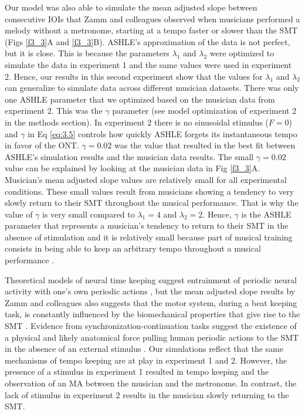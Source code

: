 \documentclass{report}
\begin{document}
Our model was also able to simulate the mean adjusted slope between consecutive IOIs that Zamm and colleagues \cite{zamm2018musicians} observed when musicians performed a melody without a metronome, starting at a tempo faster or slower than the SMT (Figs \ref{f3_3}A and \ref{f3_3}B). ASHLE's approximation of the data is not perfect, but it is close. This is because the parameters $\lambda_1$ and $\lambda_2$ were optimized to simulate the data in experiment 1 and the same values were used in experiment 2. Hence, our results in this second experiment show that the values for $\lambda_1$ and $\lambda_2$ can generalize to simulate data across different musician datasets. There was only one ASHLE parameter that we optimized based on the musician data from experiment 2. This was the $\gamma$ parameter (see model optimization of experiment 2 in the methods section). In experiment 2 there is no sinusoidal stimulus ($F=0$) and $\gamma$ in Eq \eqref{eq:3.5} controls how quickly ASHLE forgets its instantaneous tempo in favor of the ONT. $\gamma = 0.02$ was the value that resulted in the best fit between ASHLE's simulation results and the musician data results. The small $\gamma=0.02$ value can be explained by looking at the musician data in Fig \ref{f3_3}A. Musician's mean adjusted slope values are relatively small for all experimental conditions. These small values result from musicians showing a tendency to very slowly return to their SMT throughout the musical performance. That is why the value of $\gamma$ is very small compared to $\lambda_1=4$ and $\lambda_2=2$. Hence, $\gamma$ is the ASHLE parameter that represents a musician's tendency to return to their SMT in the absence of stimulation and it is relatively small because part of musical training consists in being able to keep an arbitrary tempo throughout a musical performance \cite{fine2009memory, schultz2019roles}.

Theoretical models of neural time keeping suggest entrainment of periodic neural activity with one's own periodic actions \cite{large1999dynamics}, but the mean adjusted slope results by Zamm and colleagues \cite{zamm2018musicians} also suggests that the motor system, during a beat keeping task, is constantly influenced by the biomechanical properties that give rise to the SMT \cite{goodman2000advantages}. Evidence from synchronization-continuation tasks suggest the existence of a physical and likely anatomical force pulling human periodic actions to the SMT in the absence of an external stimulus \cite{yu2003task, mcauley2006time}. Our simulations reflect that the same mechanisms of tempo keeping are at play in experiment 1 and 2. However, the presence of a stimulus in experiment 1 resulted in tempo keeping and the observation of an MA between the musician and the metronome. In contrast, the lack of stimulus in experiment 2 results in the musician slowly returning to the SMT.
\end{document}
